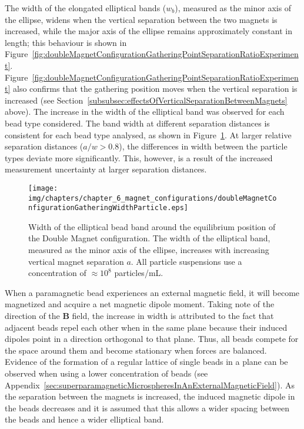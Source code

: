 The width of the elongated elliptical bands ($w_{b}$), measured as the minor axis of the ellipse, widens when the vertical separation between the two magnets is increased, while the major axis of the ellipse remains approximately constant in length; this behaviour is shown in Figure~\ref{fig:doubleMagnetConfigurationGatheringPointSeparationRatioExperiment}. Figure~\ref{fig:doubleMagnetConfigurationGatheringPointSeparationRatioExperiment} also confirms that the gathering position moves when the vertical separation is increased (see Section~\ref{subsubsec:effectsOfVerticalSeparationBetweenMagnets} above). The increase in the width of the elliptical band was observed for each bead type considered. The band width at different separation distances is consistent for each bead type analysed, as shown in Figure~\ref{fig:doubleMagnetConfigurationGatheringWidthParticle}. At larger relative separation distances ($a/w>0.8$), the differences in width between the particle types deviate more significantly. This, however, is a result of the increased measurement uncertainty at larger separation distances.

\begin{figure}[htb]
   \centering
   \texttt{[image: img/chapters/chapter\_6\_magnet\_configurations/doubleMagnetConfigurationGatheringWidthParticle.eps]}
   \caption[Elliptical equilibrium band width of different particle types]{Width of the elliptical bead band around the equilibrium position of the Double Magnet configuration. The width of the elliptical band, measured as the minor axis of the ellipse, increases with increasing vertical magnet separation $a$. All particle suspensions use a concentration of $\approx 10^{8}$ particles/mL.}
   \label{fig:doubleMagnetConfigurationGatheringWidthParticle}
\end{figure}

When a paramagnetic bead experiences an external magnetic field, it will become magnetized and acquire a net magnetic dipole moment. Taking note of the direction of the $\mathbf{B}$ field, the increase in width is attributed to the fact that adjacent beads repel each other when in the same plane because their induced dipoles point in a direction orthogonal to that plane. Thus, all beads compete for the space around them and become stationary when forces are balanced. Evidence of the formation of a regular lattice of single beads in a plane can be observed when using a lower concentration of beads (see Appendix~\ref{sec:superparamagneticMicrospheresInAnExternalMagneticField}). As the separation between the magnets is increased, the induced magnetic dipole in the beads decreases and it is assumed that this allows a wider spacing between the beads and hence a wider elliptical band.

